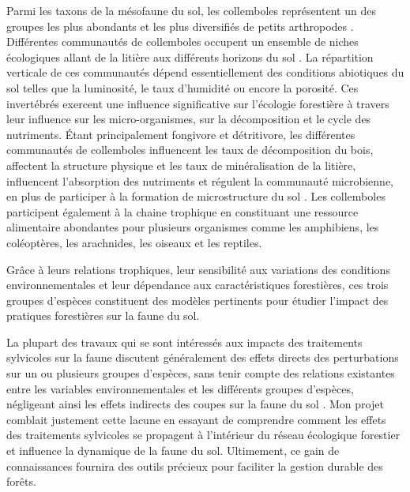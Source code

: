 Parmi les taxons de la mésofaune du sol, les collemboles représentent un des groupes les plus abondants et les plus diversifiés de petits arthropodes \citep{rusekBiodiversityCollembolaTheir1998}. 
Différentes communautés de collemboles occupent un ensemble de niches écologiques allant de la litière aux différents horizons du sol \citep{pongeVerticalDistributionCollembola2000}.
La répartition verticale de ces communautés dépend essentiellement des conditions abiotiques du sol telles que la luminosité, le taux d’humidité ou encore la porosité.
Ces invertébrés exercent une influence significative sur l'écologie forestière à travers leur influence sur les micro-organismes, sur la décomposition et le cycle des nutriments.
Étant principalement fongivore et détritivore, les différentes communautés de collemboles influencent les taux de décomposition du bois, affectent la structure physique et les taux de minéralisation de la litière, 
influencent l'absorption des nutriments et régulent la communauté microbienne, en plus de participer à la formation de microstructure du sol \citep{Petersen1982comparativeanalysis,Neher2012Linkinginvertebrate,Maass2015Functionalrole,Potapov2016Connectingtaxonomy}. 
Les collemboles participent également à la chaine trophique en constituant une ressource alimentaire abondantes pour plusieurs organismes comme les amphibiens, les coléoptères, les arachnides, les oiseaux et les reptiles.

Grâce à leurs relations trophiques, leur sensibilité aux variations des conditions environnementales et leur dépendance aux caractéristiques forestières, ces trois groupes d'espèces constituent des modèles pertinents pour étudier l'impact des pratiques forestières sur la faune du sol. 

La plupart des travaux qui se sont intéressés aux impacts des traitements sylvicoles sur la faune discutent généralement des effets directs des perturbations sur un ou plusieurs groupes d'espèces, 
sans tenir compte des relations existantes entre les variables environnementales et les différents groupes d'espèces, 
négligeant ainsi les effets indirects des coupes sur la faune du sol \citep{josephIntegratingOccupancyModels2016,Pollierer2021Diversityfunctional,Kudrin2023metaanalysiseffects}. 
Mon projet comblait justement cette lacune en essayant de comprendre comment les effets des traitements sylvicoles se propagent à l’intérieur du réseau écologique forestier et influence la dynamique de la faune du sol.  
Ultimement, ce gain de connaissances fournira des outils précieux pour faciliter la gestion durable des forêts.


